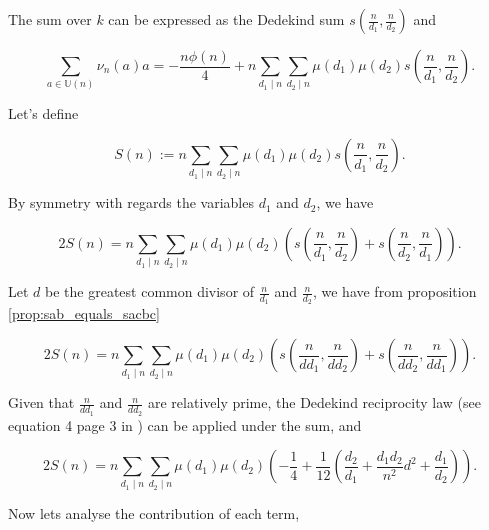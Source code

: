 \documentclass[a4paper,12pt]{article}
\newcommand{\setU}[1]{\mathbb{U}\left( #1 \right)}
\begin{document}
The sum over $k$ can be expressed as the Dedekind sum $s\left(\frac{n}{d_1},\frac{n}{d_2}\right)$ and

\begin{equation}
\sum_{a\in \setU{n}}\nu_n(a)a = -\frac{n\phi(n)}{4} + n \sum_{d_1\mid n}\sum_{d_2\mid n} \mu(d_1)\mu(d_2) s\left(\frac{n}{d_1},\frac{n}{d_2}\right). \label{eq:expr_sum_ainUn_nunaa}
\end{equation}

Let's define

\begin{equation*}
S(n) := n \sum_{d_1\mid n}\sum_{d_2\mid n} \mu(d_1)\mu(d_2) s\left(\frac{n}{d_1},\frac{n}{d_2}\right).
\label{eq:def_Sn}
\end{equation*}

By symmetry with regards the variables $d_1$ and $d_2$, we have

\begin{equation*}
2S(n) = n \sum_{d_1\mid n}\sum_{d_2\mid n} \mu(d_1)\mu(d_2) \left( s\left(\frac{n}{d_1},\frac{n}{d_2}\right) + s\left(\frac{n}{d_2},\frac{n}{d_1}\right) \right).
\end{equation*}

Let $d$ be the greatest common divisor of $\frac{n}{d_1}$ and $\frac{n}{d_2}$, we have from proposition \ref{prop:sab_equals_sacbc}

\begin{equation*}
2S(n) = n \sum_{d_1 \mid n} \sum_{d_2 \mid n} \mu(d_1) \mu(d_2) \left( s\left(\frac{n}{dd_1},\frac{n}{dd_2}\right) + s\left(\frac{n}{dd_2},\frac{n}{dd_1}\right) \right).
\end{equation*}

Given that $\frac{n}{dd_1}$ and $\frac{n}{dd_2}$ are relatively prime, the Dedekind reciprocity law (see equation 4 page 3 in \cite{rademacher1972dedekind}) can be applied under the sum, and

\begin{equation*}
2S(n) = n \sum_{d_1 \mid n} \sum_{d_2 \mid n} \mu(d_1) \mu(d_2) \left( -\frac{1}{4} + \frac{1}{12}\left( \frac{d_2}{d_1} + \frac{d_1d_2}{n^2}d^2 + \frac{d_1}{d_2} \right) \right).
\end{equation*}

Now lets analyse the contribution of each term,
\end{document}
